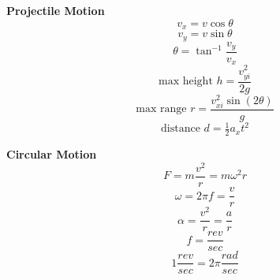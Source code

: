\documentclass[12pt]{article}
\begin{document}
\pagebreak
\begin{minipage}[t]{.5\textwidth}
\textbf{\large{Projectile Motion}} \\
	\[v_x = v \cos \theta \]
	\[v_y = v \sin \theta \]
	\[\theta = \tan ^{-1} \frac{v_y}{v_x} \]
	\[\text{max height   } h = \frac{v_{yi}^2}{2g} \]
	\[\text{max range   } r = \frac{v_{xi}^2 \sin(2\theta)}{g} \]
	\[\text{distance    } d = \tfrac{1}{2} a_x t^2\]

\end{minipage}\vspace{12pt}
\begin{minipage}[t]{.5\textwidth}
\textbf{\large{Circular Motion}} \\
	\[F = m \frac{v^2}{r} = m\omega^2 r \]
	\[\omega = 2\pi f = \frac{v}{r}\]
	\[\alpha = \frac{v^2}{r} = \frac{a}{r}\]
	\[f = \frac{rev}{sec} \]
	\[1 \frac{rev}{sec} = 2\pi \frac{rad}{sec} \]

\end{minipage}
\end{document}
